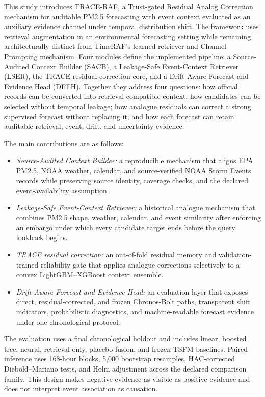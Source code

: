 \documentclass{ieeeaccess}
\begin{document}
This study introduces TRACE-RAF, a Trust-gated Residual Analog Correction
mechanism for auditable PM2.5 forecasting with event context evaluated as an
auxiliary evidence channel under temporal distribution shift.
The framework uses retrieval augmentation in an environmental forecasting
setting while remaining architecturally distinct from TimeRAF's learned
retriever and Channel Prompting mechanism. Four modules define the
implemented pipeline: a Source-Audited Context Builder (SACB), a Leakage-Safe
Event-Context Retriever (LSER), the TRACE residual-correction core, and a
Drift-Aware Forecast and Evidence Head (DFEH). Together they address four
questions: how official records can be converted into retrieval-compatible
context; how candidates can be selected without temporal leakage; how analogue
residuals can correct a strong supervised forecast without replacing it; and
how each forecast can retain auditable retrieval, event, drift, and uncertainty
evidence.

The main contributions are as follows:
\begin{itemize}
    \item \textit{Source-Audited Context Builder:} a reproducible mechanism
    that aligns EPA PM2.5, NOAA weather, calendar, and source-verified NOAA Storm
    Events records while preserving source identity, coverage checks, and the
    declared event-availability assumption.
    \item \textit{Leakage-Safe Event-Context Retriever:} a historical analogue
    mechanism that combines PM2.5 shape, weather, calendar, and event
    similarity after enforcing an embargo under which every candidate target
    ends before the query lookback begins.
    \item \textit{TRACE residual correction:} an out-of-fold residual memory
    and validation-trained reliability gate that applies analogue corrections
    selectively to a convex LightGBM--XGBoost context ensemble.
    \item \textit{Drift-Aware Forecast and Evidence Head:} an evaluation layer
    that exposes direct, residual-corrected, and frozen Chronos-Bolt paths,
    transparent shift indicators, probabilistic diagnostics, and
    machine-readable forecast evidence under one chronological protocol.
\end{itemize}

The evaluation uses a final chronological holdout and includes linear, boosted
tree, neural, retrieval-only, placebo-fusion, and frozen-TSFM baselines. Paired
inference uses 168-hour blocks, 5,000 bootstrap resamples, HAC-corrected
Diebold--Mariano tests, and Holm adjustment across the declared comparison
family. This design makes negative evidence as visible as positive evidence and
does not interpret event association as causation.
\end{document}
